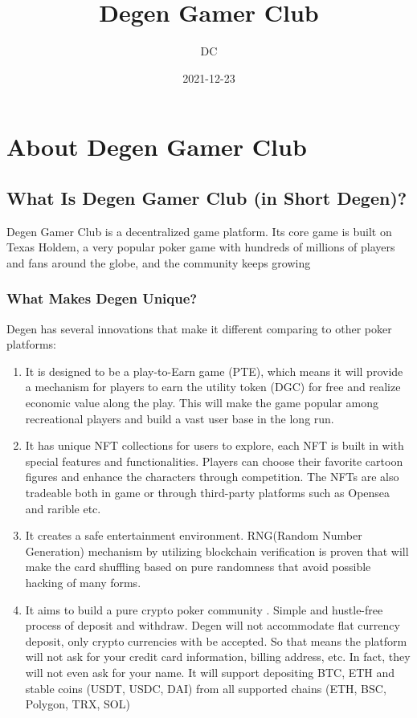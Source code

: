 \documentclass[
]{book}
\title{Degen Gamer Club}
\author{DC}
\date{2021-12-23}
\begin{document}
\maketitle

{
\setcounter{tocdepth}{1}
\tableofcontents
}
\hypertarget{about-degen-gamer-club}{%
\chapter{About Degen Gamer Club}\label{about-degen-gamer-club}}

\hypertarget{what-is-degen-gamer-club-in-short-degen}{%
\section{What Is Degen Gamer Club (in Short Degen)?}\label{what-is-degen-gamer-club-in-short-degen}}

Degen Gamer Club is a decentralized game platform. Its core game is built on Texas Holdem, a very popular poker game with hundreds of millions of players and fans around the globe, and the community keeps growing

\hypertarget{what-makes-degen-unique}{%
\subsection{What Makes Degen Unique?}\label{what-makes-degen-unique}}

Degen has several innovations that make it different comparing to other poker platforms:

\begin{enumerate}
\def\labelenumi{\arabic{enumi}.}
\item
  It is designed to be a play-to-Earn game (PTE), which means it will provide a mechanism for players to earn the utility token (DGC) for free and realize economic value along the play. This will make the game popular among recreational players and build a vast user base in the long run.
\item
  It has unique NFT collections for users to explore, each NFT is built in with special features and functionalities. Players can choose their favorite cartoon figures and enhance the characters through competition. The NFTs are also tradeable both in game or through third-party platforms such as Opensea and rarible etc.
\item
  It creates a safe entertainment environment. RNG(Random Number Generation) mechanism by utilizing blockchain verification is proven that will make the card shuffling based on pure randomness that avoid possible hacking of many forms.
\item
  It aims to build a pure crypto poker community . Simple and hustle-free process of deposit and withdraw. Degen will not accommodate flat currency deposit, only crypto currencies with be accepted. So that means the platform will not ask for your credit card information, billing address, etc. In fact, they will not even ask for your name. It will support depositing BTC, ETH and stable coins (USDT, USDC, DAI) from all supported chains (ETH, BSC, Polygon, TRX, SOL)
\end{enumerate}
\end{document}
